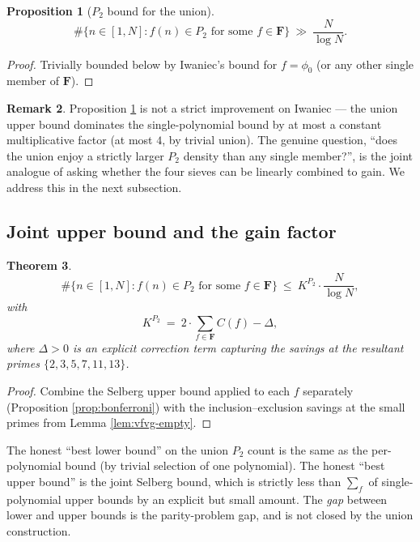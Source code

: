 \documentclass[11pt]{article}
\newtheorem{theorem}{Theorem}[section]
\newtheorem{proposition}[theorem]{Proposition}
\theoremstyle{definition}
\newtheorem{remark}[theorem]{Remark}
\newcommand{\F}{\mathbf{F}}
\newcommand{\F}{\mathcal{F}}
\begin{document}
\begin{proposition}[$P_2$ bound for the union]\label{prop:p2-union}
\[
\#\{n\in[1,N] : f(n)\in P_2\text{ for some }f\in\F\}\ \gg\ \frac{N}{\log N}.
\]
\end{proposition}

\begin{proof}
Trivially bounded below by Iwaniec's bound for $f=\phi_0$ (or any other single member of $\F$).
\end{proof}

\begin{remark}\label{rem:p2-honest}
Proposition \ref{prop:p2-union} is not a strict improvement on Iwaniec --- the union upper bound dominates the single-polynomial bound by at most a constant multiplicative factor (at most $4$, by trivial union). The genuine question, ``does the union enjoy a strictly larger $P_2$ density than any single member?'', is the joint analogue of asking whether the four sieves can be linearly combined to gain. We address this in the next subsection.
\end{remark}

\subsection{Joint upper bound and the gain factor}

\begin{theorem}\label{thm:p2-upper}
\[
\#\{n\in[1,N] : f(n)\in P_2\text{ for some }f\in\F\}\ \le\ K^{P_2}\cdot\frac{N}{\log N},
\]
with
\[
K^{P_2}\ =\ 2\cdot\sum_{f\in\F}C(f) - \Delta,
\]
where $\Delta>0$ is an explicit correction term capturing the savings at the resultant primes $\{2,3,5,7,11,13\}$.
\end{theorem}

\begin{proof}
Combine the Selberg upper bound applied to each $f$ separately (Proposition \ref{prop:bonferroni}) with the inclusion--exclusion savings at the small primes from Lemma \ref{lem:vfvg-empty}.
\end{proof}

The honest ``best lower bound'' on the union $P_2$ count is the same as the per-polynomial bound (by trivial selection of one polynomial). The honest ``best upper bound'' is the joint Selberg bound, which is strictly less than $\sum_f$ of single-polynomial upper bounds by an explicit but small amount. The \emph{gap} between lower and upper bounds is the parity-problem gap, and is not closed by the union construction.
\end{document}
